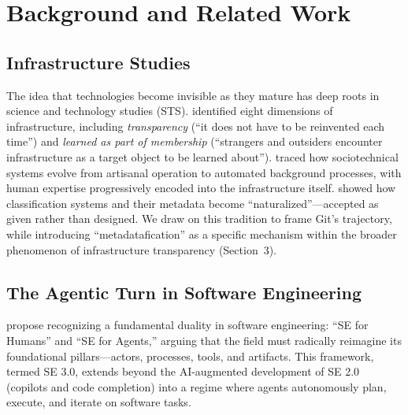 \documentclass[sigconf, nonacm, anonymous=false]{acmart}
\begin{document}
\section{Background and Related Work}

\subsection{Infrastructure Studies}

The idea that technologies become invisible as they mature has deep roots in science and technology studies (STS). \citet{star1996steps} identified eight dimensions of infrastructure, including \textit{transparency} (``it does not have to be reinvented each time'') and \textit{learned as part of membership} (``strangers and outsiders encounter infrastructure as a target object to be learned about''). \citet{edwards2003infrastructure} traced how sociotechnical systems evolve from artisanal operation to automated background processes, with human expertise progressively encoded into the infrastructure itself. \citet{bowker1999sorting} showed how classification systems and their metadata become ``naturalized''---accepted as given rather than designed. We draw on this tradition to frame Git's trajectory, while introducing ``metadatafication'' as a specific mechanism within the broader phenomenon of infrastructure transparency (Section~3).

\subsection{The Agentic Turn in Software Engineering}

\citet{hassan2025agentic} propose recognizing a fundamental duality in software engineering: ``SE for Humans'' and ``SE for Agents,'' arguing that the field must radically reimagine its foundational pillars---actors, processes, tools, and artifacts. This framework, termed SE 3.0, extends beyond the AI-augmented development of SE 2.0 (copilots and code completion) into a regime where agents autonomously plan, execute, and iterate on software tasks.
\end{document}
